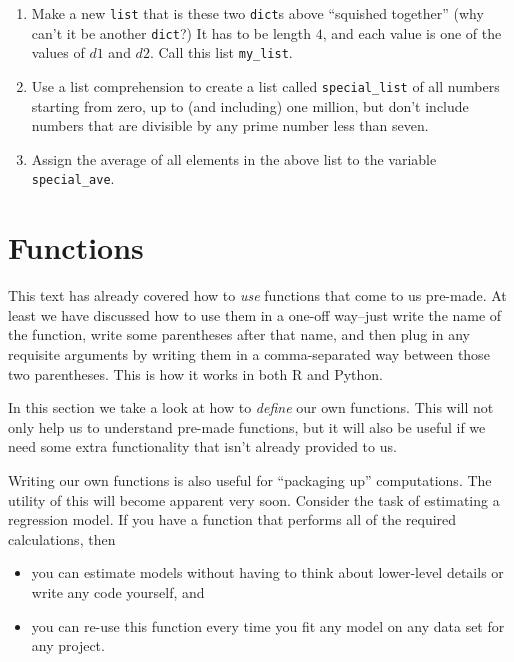 \documentclass[12pt,krantz2]{krantz}
\providecommand{\tightlist}{%
  \setlength{\itemsep}{0pt}\setlength{\parskip}{0pt}}
\begin{document}
\begin{enumerate}
\def\labelenumi{\alph{enumi})}
\item
  Make a new \texttt{list} that is these two \texttt{dict}s above ``squished together'' (why can't it be another \texttt{dict}?) It has to be length \(4\), and each value is one of the values of \(d1\) and \(d2\). Call this list \texttt{my\_list}.
\item
  Use a list comprehension to create a list called \texttt{special\_list} of all numbers starting from zero, up to (and including) one million, but don't include numbers that are divisible by any prime number less than seven.
\item
  Assign the average of all elements in the above list to the variable \texttt{special\_ave}.
\end{enumerate}

\hypertarget{functions}{%
\chapter{Functions}\label{functions}}

This text has already covered how to \emph{use} functions that come to us pre-made. At least we have discussed how to use them in a one-off way--just write the name of the function, write some parentheses after that name, and then plug in any requisite arguments by writing them in a comma-separated way between those two parentheses. This is how it works in both R and Python.

In this section we take a look at how to \emph{define} our own functions. This will not only help us to understand pre-made functions, but it will also be useful if we need some extra functionality that isn't already provided to us.

Writing our own functions is also useful for ``packaging up'' computations. The utility of this will become apparent very soon. Consider the task of estimating a regression model. If you have a function that performs all of the required calculations, then

\begin{itemize}
\tightlist
\item
  you can estimate models without having to think about lower-level details or write any code yourself, and
\item
  you can re-use this function every time you fit any model on any data set for any project.
\end{itemize}
\end{document}
